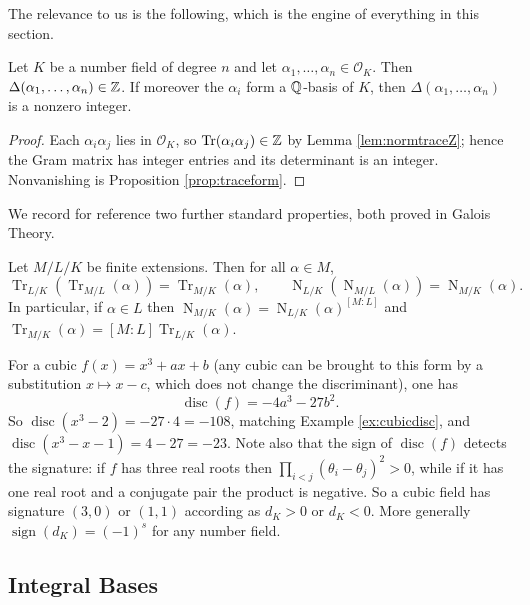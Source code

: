 \documentclass[a4paper]{scrartcl}
\renewcommand{\OO}{\mathcal{O}}
\newcommand{\disc}{\operatorname{disc}}
\newcommand{\Nm}{\operatorname{N}}
\newcommand{\Tr}{\operatorname{Tr}}
\begin{document}
The relevance to us is the following, which is the engine of everything in this section.

\begin{lemma}\label{lem:discint}
	Let $K$ be a number field of degree $n$ and let $\alpha_1, \dots, \alpha_n \in \OO_K$. Then $\Delta(\alpha_1,\dots,\alpha_n) \in \mathbb{Z}$. If moreover the $\alpha_i$ form a $\mathbb{Q}$-basis of $K$, then $\Delta(\alpha_1,\dots,\alpha_n)$ is a nonzero integer.
\end{lemma}

\begin{proof}
	Each $\alpha_i\alpha_j$ lies in $\OO_K$, so $\Tr(\alpha_i\alpha_j) \in \Z$ by Lemma \ref{lem:normtraceZ}; hence the Gram matrix has integer entries and its determinant is an integer. Nonvanishing is Proposition \ref{prop:traceform}.
\end{proof}

We record for reference two further standard properties, both proved in Galois Theory.

\begin{proposition}[Transitivity]\label{prop:transitivity}
	Let $M/L/K$ be finite extensions. Then for all $\alpha \in M$,
	$$\Tr_{L/K}\left(\Tr_{M/L}(\alpha)\right) = \Tr_{M/K}(\alpha), \qquad \Nm_{L/K}\left(\Nm_{M/L}(\alpha)\right) = \Nm_{M/K}(\alpha).$$
	In particular, if $\alpha \in L$ then $\Nm_{M/K}(\alpha) = \Nm_{L/K}(\alpha)^{[M:L]}$ and $\Tr_{M/K}(\alpha) = [M:L]\Tr_{L/K}(\alpha)$.
\end{proposition}

\begin{example}\label{ex:cubicdiscformula}
	For a cubic $f(x) = x^3+ax+b$ (any cubic can be brought to this form by a substitution $x \mapsto x - c$, which does not change the discriminant), one has
	$$\disc(f) = -4a^3-27b^2.$$
	So $\disc(x^3-2) = -27\cdot4 = -108$, matching Example \ref{ex:cubicdisc}, and $\disc(x^3-x-1) = 4-27 = -23$. Note also that the sign of $\disc(f)$ detects the signature: if $f$ has three real roots then $\prod_{i<j}(\theta_i-\theta_j)^2 > 0$, while if it has one real root and a conjugate pair the product is negative. So a cubic field has signature $(3,0)$ or $(1,1)$ according as $d_K > 0$ or $d_K < 0$. More generally $\operatorname{sign}(d_K) = (-1)^s$ for any number field.
\end{example}

\subsection{Integral Bases}
\end{document}
